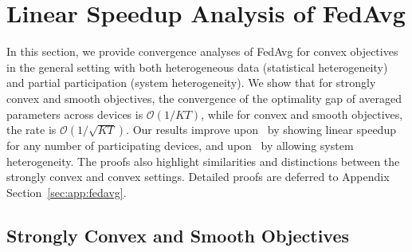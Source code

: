 


\section{Linear Speedup Analysis of FedAvg}
\label{sec:sgd}

In this section, we provide convergence analyses of FedAvg for convex objectives in the general setting with both heterogeneous data (statistical heterogeneity) and partial
participation (system heterogeneity). We show that for strongly convex and smooth objectives,
the convergence of the optimality gap of averaged parameters across
devices is $\mathcal{O}(1/KT)$, while for convex and smooth
objectives, the rate is $\mathcal{O}(1/\sqrt{KT})$. Our results improve upon~\cite{li2019convergence,karimireddy2019scaffold} by showing linear speedup for any number of participating devices, and upon~\cite{khaled2020tighter,koloskova2020unified} by allowing system heterogeneity. The proofs also highlight similarities and distinctions between the strongly convex and convex settings. Detailed proofs are deferred to Appendix Section~\ref{sec:app:fedavg}.

\subsection{Strongly Convex and Smooth Objectives}

